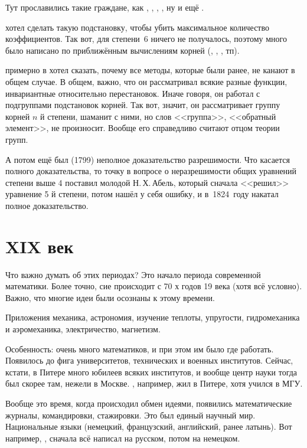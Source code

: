 \documentclass[a4paper,oneside,fleqn,10pt]{article}
\begin{document}
Тут прославились такие граждане, как , ,
, , ну и ещё .

 хотел сделать такую подстановку, чтобы убить
максимальное количество коэффициентов.  Так вот, для степени~6 ничего
не получалось, поэтому много было написано по приближённым вычислениям
корней (, , , тп).

 примерно в  хотел сказать, почему все
методы, которые были ранее, не канают в общем случае. В общем, важно,
что он рассматривал всякие разные функции, инвариантные относительно
перестановок. Иначе говоря, он работал с подгруппами подстановок
корней.  Так вот, значит, он рассматривает группу корней $n$ й
степени, шаманит с ними, но слов <<группа>>, <<обратный элемент>>, не
произносит.  Вообще его справедливо считают отцом теории групп.

А потом ещё был  (1799) неполное доказательство
разрешимости.  Что касается полного доказательства, то точку в вопросе
о неразрешимости общих уравнений степени выше 4 поставил молодой
Н.\,Х.\,Абель, который сначала <<решил>> уравнение 5 й степени, потом
нашёл у себя ошибку, и в~1824~году накатал полное доказательство.



\section{XIX век}

Что важно думать об этих периодах? Это начало периода современной
математики.  Более точно, сие происходит с 70 х годов 19 века (хотя
всё условно).  Важно, что многие идеи были осознаны к этому времени.

Приложения механика, астрономия, изучение теплоты, упругости,
гидромеханика и аэромеханика, электричество, магнетизм.

Особенность: очень много математиков, и при этом им было где
работать. Появилось до фига университетов, технических и военных
институтов. Сейчас, кстати, в Питере много юбилеев всяких институтов,
и вообще центр науки тогда был скорее там, нежели в Москве.
, например, жил в Питере, хотя учился в МГУ.

Вообще это время, когда происходил обмен идеями, появились
математические журналы, командировки, стажировки. Это был единый
научный мир. Национальные языки (немецкий, французский, английский,
ранее латынь). Вот например, , сначала всё написал
на русском, потом на немецком.
\end{document}
